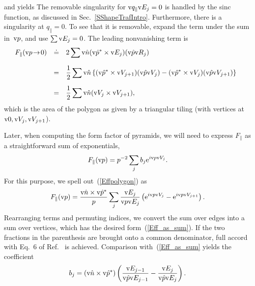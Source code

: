 and yields
The removable singularity for $\text{v}{q}_\parallel\text{v}{E}_j=0$
is handled by the sinc function, as discussed in Sec.~\ref{SShapeTrafIntro}.
Furthermore, there is a singularity at $q_\parallel=0$.
To see that it is removable,
expand the term under the sum in~$\text{v}{p}$,
and use $\sum\text{v}{E}_j=0$.
The leading nonvanishing term is
\begin{equation}
  \begin{array}{@{}lcl}
  F_\parallel(\qp\!\to\!0)
    &\doteq& \displaystyle 2\sum \n(\uqp^*\times\E_j) (\uqp\R_j)\\[3ex]
    &=&\displaystyle \frac{1}{2}\sum \n\left\{
        (\uqp^*\times\V_{j+1})(\uqp\V_j)
      - (\uqp^*\times\V_j)(\uqp\V_{j+1})
      \right\}\\[3ex]
    &=&\displaystyle \frac{1}{2}\sum \n(\V_j\times\V_{j+1}),
  \end{array}
\end{equation}
which is the area of the polygon
as given by a triangular tiling (with vertices at $\text{v}{0},\text{v}{V}_j,\text{v}{V}_{j+1}$).

Later, when computing the form factor of pyramids,
we will need to express $F_\parallel$ as a straightforward sum
of exponentials,
\begin{equation}\label{Eff_as_sum}
  F_\parallel(\text{v}{p})=p^{-2}\sum_j b_j \text{e}^{i\text{v}{p} \text{v}{V}_j}.
\end{equation}
For this purpose,
we spell out~(\ref{Effpolygon}) as
\begin{equation}
    F_\parallel(\text{v}{p})
    = \frac{\text{v}{\hat n}\times\text{v}{\hat p}^*}{p} \sum_{j} \frac{\text{v}{E}_j}{\text{v}{p}\text{v}{E}_j}
       \left(\text{e}^{i\text{v}{p}\text{v}{V}_j}-\text{e}^{i\text{v}{p}\text{v}{V}_{j+1}}\right).
\end{equation}
Rearranging terms and permuting indices,
we convert the sum over edges into a sum over vertices,
which has the desired form~(\ref{Eff_as_sum}).
If the two fractions in the parenthesis are brought onto a common denominator,
full accord with Eq.~6 of Ref.~\cite{LeMi83} is achieved.
Comparison with~(\ref{Eff_as_sum} yields the coefficient
\begin{equation}
  b_j = (\text{v}{\hat n}\times\text{v}{\hat p}^*)\left( \frac{\text{v}{E}_{j-1}}{\text{v}{\hat p}\text{v}{E}_{j-1}} - \frac{\text{v}{E}_j}{\text{v}{\hat p}\text{v}{E}_j} \right).
\end{equation}

